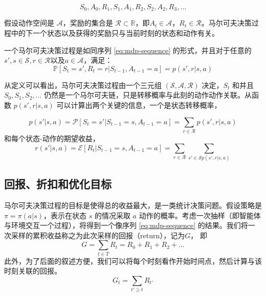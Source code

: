\begin{equation}
    S_0, A_0, R_1, S_1, A_1, R_2, S_2, A_2, R_3,\dots
    \label{eq:mdp-sequence}
\end{equation}

假设动作空间是 $\mathcal{A}$，奖励的集合是 $\mathcal{R} \subset \mathbb{R}$，即$A_t \in \mathcal{A}$，$R_t \in \mathcal{R}$。马尔可夫决策过程中的下一个状态以及获得的奖励只与当前时刻的状态和动作有关。

\begin{definition}[马尔可夫决策过程]
    一个马尔可夫决策过程是如同序列 \ref{eq:mdp-sequence} 的形式，并且对于任意的$s', s \in \mathcal{S}, r \in \mathcal{R} \text{以及} a\in \mathcal{A}$，满足：
    \begin{equation}
        \mathbb{P}[S_t = s', R_t = r| S_{t-1}, A_{t-1} = a] = p(s', r | s, a)
        \label{def:mdp}
    \end{equation}
\end{definition}

从定义可以看出，马尔可夫决策过程由一个三元组 $(\mathcal{S}, \mathcal{A}, \mathcal{R})$ 决定，$S_t$ 和并且 $S_0, S_1, S_2, \dots$ 仍然是一个马尔可夫链，只是转移概率与此刻的动作动作关联。从函数 $p(s', r|s, a)$ 可以计算出两个关键的信息，一个是状态转移概率，

\begin{equation}
    p(s'|s, a) = \mathcal{P}[S_t = s' | S_{t-1} = s, A_{t-1} = a] = \sum_{r\in \mathcal{R}} p(s', r|s, a)
\end{equation}
和每个状态-动作的期望收益，
\begin{equation}
    r(s' | s, a) = \mathcal{E} [R_t | S_{t-1} = s, A_{t-1} = a] = \sum_{r\in \mathcal{R}} \sum_{s' \in \mathcal{S} p(s', r | s, a)}
\end{equation}


\subsection{回报、折扣和优化目标}
马尔可夫决策过程的目标是使得总的收益最大，是一类统计决策问题。假设策略是 $\pi = \pi(a | s)$，表示在状态 $s$ 的情况采取 $a$ 动作的概率。考虑一次抽样（即智能体与环境交互一个过程），将得到一个像序列 \ref{eq:mdp-sequence} 的结果。我们将一次采样的累积收益称之为此次采样的回报（return），记为$G$， 即
\begin{equation}
    G = \sum_{t \in T} R_t = R_0 + R_1 + R_2 + \dots
\end{equation}
此外，为了后面的叙述方便，我们可以将每个时刻看作开始时间点，然后计算与该时刻关联的回报。
\begin{equation}
    G_t = \sum_{t' \geq t} R_{t'}
\end{equation}

